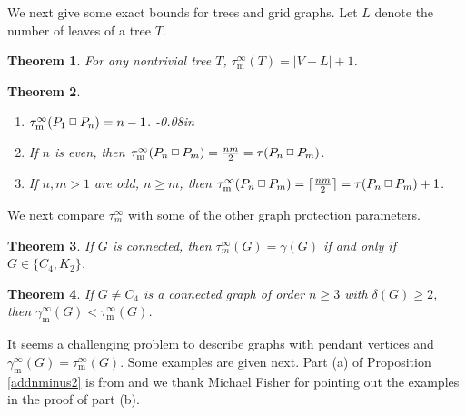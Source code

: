 \documentclass[12pt]{article}%
\newtheorem{theorem}{Theorem}[section]
\providecommand{\boksie}{\ensuremath{\mathbin{\raisebox{0.3mm}{$\scriptstyle\square$}}}}
\begin{document}
We next give some exact bounds for trees and grid graphs. Let $L$ denote the
number of leaves of a tree $T$.

\begin{theorem}
\emph{\cite{KM5}} \label{tree}For any nontrivial tree $T$, $\tau_{\mathrm{m}%
}^{\infty}(T)=|V-L|+1$.
\end{theorem}

\begin{theorem}
\label{grids}

\begin{enumerate}
\item[(a)] $\tau_{\mathrm{m}}^{\infty}(P_{1}\boksie P_{n})=n-1$.\vspace
{-0.08in}

\item[\emph{(b)}] If $n$ is even, then $\tau_{\mathrm{m}}^{\infty}%
(P_{n}\boksie P_{m})=\frac{nm}{2}=\tau(P_{n}\boksie P_{m})$.\vspace{-0.08in}

\item[\emph{(c)}] If $n,m>1$ are odd, $n\geq m$, then $\tau_{\mathrm{m}%
}^{\infty}(P_{n}\boksie P_{m})=\lceil\frac{nm}{2}\rceil=\tau(P_{n}\boksie
P_{m})+1$.
\end{enumerate}
\end{theorem}

We next compare $\tau_{m}^{\infty}$ with some of the other graph protection parameters.

\begin{theorem}
\emph{\cite{KGTN}\hspace{0.1in}}If $G$ is connected, then $\tau_{m}^{\infty
}(G)=\gamma(G)$ if and only if $G\in\{C_{4},K_{2}\}$.
\end{theorem}

\begin{theorem}
\emph{\cite{KM5}}\hspace{0.1in}If $G\neq C_{4}$ is a connected graph of order
$n\geq3$ with $\delta(G)\geq2$, then $\gamma_{\mathrm{m}}^{\infty}%
(G)<\tau_{\mathrm{m}}^{\infty}(G)$.
\end{theorem}

It seems a challenging problem to describe graphs with pendant vertices and
$\gamma_{\mathrm{m}}^{\infty}(G)=\tau_{\mathrm{m}}^{\infty}(G)$. Some examples
are given next. Part (a) of Proposition \ref{addnminus2} is from \cite{KM5}
and we thank Michael Fisher for pointing out the examples in the proof of part (b).
\end{document}
